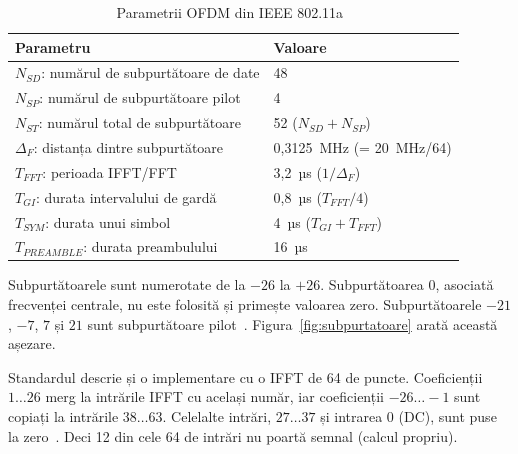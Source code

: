 \begin{table}[ht]
	\caption{Parametrii OFDM din IEEE 802.11a~\cite[Tab.~79]{ieee80211a}}
	\centering
	\begin{tabular}{|l|l|}
		\hline
		Parametru & Valoare \\
		\hline
		$N_{SD}$: numărul de subpurtătoare de date & 48 \\
		$N_{SP}$: numărul de subpurtătoare pilot & 4 \\
		$N_{ST}$: numărul total de subpurtătoare & 52 ($N_{SD} + N_{SP}$) \\
		$\Delta_F$: distanța dintre subpurtătoare & 0,3125~MHz (= 20~MHz/64) \\
		$T_{FFT}$: perioada IFFT/FFT & 3,2~µs ($1/\Delta_F$) \\
		$T_{GI}$: durata intervalului de gardă & 0,8~µs ($T_{FFT}/4$) \\
		$T_{SYM}$: durata unui simbol & 4~µs ($T_{GI} + T_{FFT}$) \\
		$T_{PREAMBLE}$: durata preambulului & 16~µs \\
		\hline
	\end{tabular}
	\label{tab:ofdm}
\end{table}

Subpurtătoarele sunt numerotate de la $-26$ la $+26$.
Subpurtătoarea $0$, asociată frecvenței centrale, nu este folosită și primește valoarea zero.
Subpurtătoarele $-21$, $-7$, $7$ și $21$ sunt subpurtătoare pilot~\cite[Sec.~17.3.2.1]{ieee80211a}.
Figura~\ref{fig:subpurtatoare} arată această așezare.

Standardul descrie și o implementare cu o IFFT de 64 de puncte.
Coeficienții $1 \ldots 26$ merg la intrările IFFT cu același număr, iar coeficienții $-26 \ldots -1$ sunt copiați la intrările $38 \ldots 63$.
Celelalte intrări, $27 \ldots 37$ și intrarea $0$ (DC), sunt puse la zero~\cite[Sec.~17.3.2.5]{ieee80211a}.
Deci 12 din cele 64 de intrări nu poartă semnal (calcul propriu).

